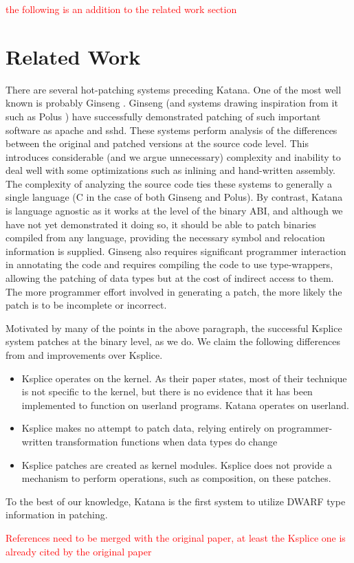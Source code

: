 \documentclass[a4paper,12pt]{article}
\begin{document}
\textcolor{red}{the following is an addition to the related work
  section}
\section{Related Work}
   There are several hot-patching systems preceding Katana. One of the
   most well known is probably Ginseng \cite{ginseng}. Ginseng (and
   systems drawing inspiration from it such as Polus \cite{polus}) have
   successfully demonstrated patching of such important software as
   apache and sshd. These systems perform analysis of the differences
   between the original and patched versions at the source code
   level. This introduces considerable (and we argue unnecessary)
   complexity and inability to deal well with some optimizations such
   as inlining and hand-written assembly. The complexity of analyzing
   the source code ties these systems to generally a single language
   (C in the case of both Ginseng and Polus). By contrast, Katana is
   language agnostic as it works at the level of the binary ABI, and
   although we have not yet demonstrated it doing so, it should be
   able to patch binaries compiled from any language, providing the
   necessary symbol and relocation information is supplied. Ginseng
   also requires significant programmer interaction in annotating the
   code \cite{ginseng-manual} and requires
   compiling the code to use type-wrappers, allowing the patching of
   data types but at the cost of indirect access to them. The more
   programmer effort involved in generating a patch, the more likely
   the patch is to be incomplete or incorrect.

   Motivated by many of the points in the above paragraph, the
   successful Ksplice system \cite{ksplice} patches at the binary level, as we do. We
   claim the following differences from and improvements over Ksplice.
   \begin{itemize}
   \item Ksplice operates on the kernel. As their paper states, most of their
     technique is not specific to the kernel, but there is no evidence
     that it has been implemented to function on userland programs.
     Katana operates on userland.
   \item Ksplice makes no attempt to patch data, relying entirely on
     programmer-written transformation functions when data types do
     change
   \item Ksplice patches are created as kernel modules. Ksplice does not
     provide a mechanism to perform operations, such as composition,
     on these patches.
   \end{itemize}
   
   To the best of our knowledge, Katana is the first system to utilize
   DWARF type information in patching. 
\vspace{1in}

\textcolor{red}{References need to be merged with the original paper,
  at least the Ksplice one is already cited by the original paper}


\end{document}
